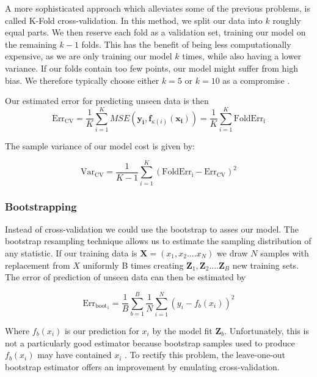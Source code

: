 \documentclass{article}
\begin{document}
A more sophisticated approach which alleviates some of the previous problems, is called K-Fold cross-validation. In this method, we split our data into $k$ roughly equal parts. We then reserve each fold as a validation set, training our model on the remaining $k-1$ folds. This has the benefit of being less computationally expensive, as we are only training our model $k$ times, while also having a lower variance. If our folds contain too few points, our model might suffer from high bias. We therefore typically choose either $k = 5$ or $k = 10$ as a compromise \cite[p.~243]{Hastie2009}.

Our estimated error for predicting unseen data is then
\begin{equation*}
    \text{Err}_{\text{CV}}= \frac{1}{K} \sum_{i=1}^{K}
    MSE(\boldsymbol{y_i},\boldsymbol{f}_{\kappa(i)}(\boldsymbol{x_i})) = \frac{1}{K} \sum_{i=1}^{K} \text{FoldErr}_{\text{i}}
\end{equation*}

The sample variance of our model cost is given by:

\begin{equation*} \text{Var}_{\text{CV}} = \frac{1}{K - 1} \sum_{i=1}^{K}( \text{FoldErr}_{\text{i}} - \text{Err}_{\text{CV}})^2
\end{equation*}



\subsubsection{Bootstrapping}
Instead of cross-validation we could use the bootstrap to asses our model. The bootstrap resampling technique allows us to estimate the sampling distribution of any statistic. If our training data is $\boldsymbol{X} = (x_1, x_2 .... x_N)$ we draw $N$ samples with replacement from $X$ uniformly B times creating $\boldsymbol{Z}_1, \boldsymbol{Z}_2 .... \boldsymbol{Z}_B$ new training sets. The error of prediction of unseen data can then be estimated by 

\begin{equation*}
    \text{Err}_{\text{boot}_1} =  \frac{1}{B} \sum_{b=1}^B \frac{1}{N} \sum_{i = 1}^N (y_i - f_b(x_i))^2
\end{equation*}

Where $f_b(x_i)$ is our prediction for $x_i$ by the model fit $\boldsymbol{Z}_b$. Unfortunately, this is not a particularly good estimator because bootstrap samples used to produce $f_b(x_i)$ may have contained $x_i$ \cite[p.~270]{Hastie2009}. To rectify this problem, the leave-one-out bootstrap estimator offers an improvement by emulating cross-validation.
\end{document}
